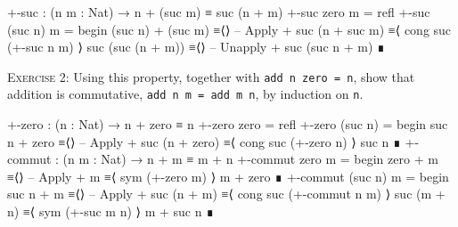 \documentclass{article}
\begin{document}
\begin{code}
+-suc : (n m : Nat) → n + (suc m) ≡ suc (n + m)
+-suc zero m = refl
+-suc (suc n) m =
  begin
    (suc n) + (suc m)
  ≡⟨⟩ -- Apply +
    suc (n + suc m)
  ≡⟨ cong suc (+-suc n m) ⟩
    suc (suc (n + m))
  ≡⟨⟩ -- Unapply +
    suc (suc n + m)
  ∎
\end{code}

\noindent
\textsc{Exercise 2}: Using this property, together with \texttt{add n zero = n}, show that addition is commutative, \texttt{add n m = add m n}, by induction on \texttt{n}.

\begin{code}
+-zero : (n : Nat) → n + zero ≡ n
+-zero zero = refl
+-zero (suc n) =
  begin
    suc n + zero
  ≡⟨⟩ -- Apply +
    suc (n + zero)
  ≡⟨ cong suc (+-zero n) ⟩
    suc n
  ∎
+-commut : (n m : Nat) → n + m ≡ m + n
+-commut zero m =
  begin
    zero + m
  ≡⟨⟩ -- Apply +
    m
  ≡⟨ sym (+-zero m) ⟩
    m + zero
  ∎
+-commut (suc n) m =
  begin
    suc n + m
  ≡⟨⟩ -- Apply +
    suc (n + m)
  ≡⟨ cong suc (+-commut n m) ⟩
    suc (m + n)
  ≡⟨ sym (+-suc m n) ⟩
    m + suc n
  ∎
\end{code}
\end{document}
